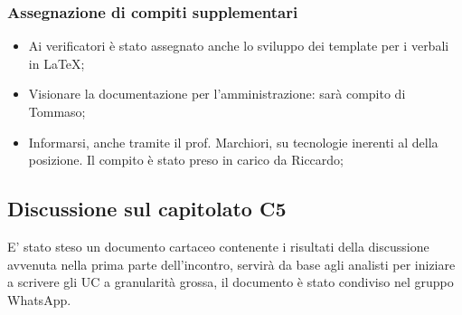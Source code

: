\subsubsection{Assegnazione di compiti supplementari}
\begin{itemize}
\item Ai verificatori è stato assegnato anche lo sviluppo dei template per i verbali in \LaTeX;
\item Visionare la documentazione per l'amministrazione: sarà compito di Tommaso;
\item Informarsi, anche tramite il prof. Marchiori, su tecnologie inerenti al  della posizione. Il compito è stato preso in carico da Riccardo;
\end{itemize}
\subsection{Discussione sul capitolato C5}
E' stato steso un documento cartaceo contenente i risultati della discussione avvenuta nella prima parte dell'incontro, servirà da base agli analisti per iniziare a scrivere gli UC a granularità grossa, il documento è stato condiviso nel gruppo WhatsApp.
\clearpage